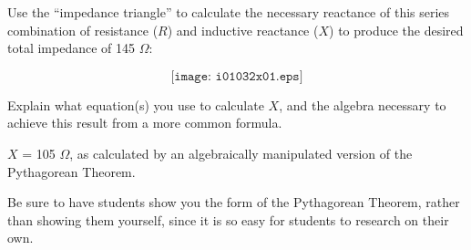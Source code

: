 

Use the ``impedance triangle'' to calculate the necessary reactance of this series combination of resistance ($R$) and inductive reactance ($X$) to produce the desired total impedance of 145 $\Omega$:

$$\texttt{[image: i01032x01.eps]}$$

Explain what equation(s) you use to calculate $X$, and the algebra necessary to achieve this result from a more common formula.







$X$ = 105 $\Omega$, as calculated by an algebraically manipulated version of the Pythagorean Theorem.







Be sure to have students show you the form of the Pythagorean Theorem, rather than showing them yourself, since it is so easy for students to research on their own.




